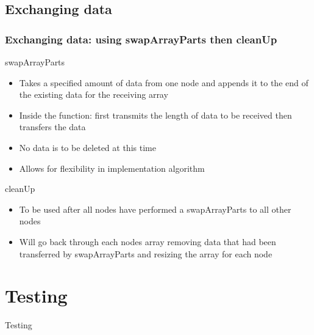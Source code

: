 \documentclass{beamer}
\begin{document}
\subsection{Exchanging data}

\begin{frame}    
    \frametitle{Exchanging data: using swapArrayParts then cleanUp}
    
    \begin{block}{swapArrayParts}
        \begin{itemize}
            \item Takes a specified amount of data from one node and appends it to the end of the existing data for the receiving array
            \item Inside the function: first transmits the length of data to be received then transfers the data
            \item No data is to be deleted at this time
            \item Allows for flexibility in implementation algorithm
        \end{itemize}
    \end{block}
    
    \begin{block}{cleanUp}
        \begin{itemize}
            \item To be used after all nodes have performed a swapArrayParts to all other nodes
            \item Will go back through each nodes array removing data that had been transferred by swapArrayParts and resizing the array for each node
        \end{itemize}
    \end{block}
\end{frame}

\section{Testing}

\begin{frame}	
	\begin{Huge}
		\begin{center}
			Testing
		\end{center}
	\end{Huge}
\end{frame}

\end{document}
